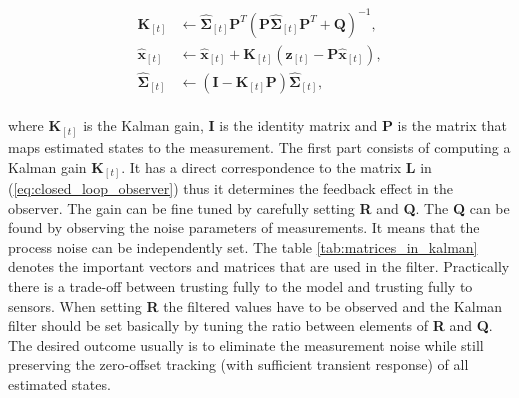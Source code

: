 \begin{equation}
\begin{split}
\textbf{K}_{[t]} &\leftarrow \hat{\boldsymbol{\Sigma}}_{[t]}\textbf{P}^{T}\left(\textbf{P}\hat{\boldsymbol{\Sigma}}_{[t]}\textbf{P}^{T} + \textbf{Q}\right)^{-1}, \\
\hat{\textbf{x}}_{[t]} &\leftarrow \hat{\textbf{x}}_{[t]} + \textbf{K}_{[t]}\left(\textbf{z}_{[t]} - \textbf{P}\hat{\textbf{x}}_{[t]}\right), \\
\hat{\boldsymbol{\Sigma}}_{[t]} &\leftarrow \left(\mathbf{I} - \textbf{K}_{[t]}\textbf{P}\right)\hat{\boldsymbol{\Sigma}}_{[t]},
\end{split}
\label{eq:kalman_correction}
\end{equation}
\\
where $\textbf{K}_{[t]}$ is the Kalman gain, $\mathbf{I}$ is the identity matrix and \textbf{P} is the matrix that maps estimated states to the measurement. The first part consists of computing a Kalman gain $\textbf{K}_{[t]}$. It has a direct correspondence to the matrix \textbf{L} in (\ref{eq:closed_loop_observer}) thus it determines the feedback effect in the observer. The gain can be fine tuned by carefully setting \textbf{R} and \textbf{Q}. The \textbf{Q} can be found by observing the noise parameters of measurements. It means that the process noise can be independently set. The table \ref{tab:matrices_in_kalman} denotes the important vectors and matrices that are used in the filter. Practically there is a trade-off between trusting fully to the model and trusting fully to sensors. When setting \textbf{R} the filtered values have to be observed and the Kalman filter should be set basically by tuning the ratio between elements of \textbf{R} and \textbf{Q}. The desired outcome usually is to eliminate the measurement noise while still preserving the zero-offset tracking (with sufficient transient response) of all estimated states.

